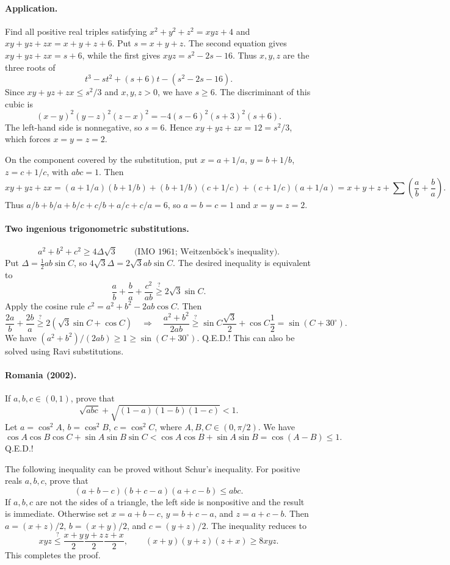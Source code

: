 \documentclass[11pt,a4paper]{article}
\begin{document}
\paragraph{Application.}
Find all positive real triples satisfying
$x^2+y^2+z^2=xyz+4$ and $xy+yz+zx=x+y+z+6$.
Put $s=x+y+z$. The second equation gives $xy+yz+zx=s+6$, while the
first gives $xyz=s^2-2s-16$. Thus $x,y,z$ are the three roots of
\[
t^3-st^2+(s+6)t-(s^2-2s-16).
\]
Since $xy+yz+zx\leq s^2/3$ and $x,y,z>0$, we have $s\geq6$.
The discriminant of this cubic is
\[
(x-y)^2(y-z)^2(z-x)^2=-4(s-6)^2(s+3)^2(s+6).
\]
The left-hand side is nonnegative, so $s=6$. Hence
$xy+yz+zx=12=s^2/3$, which forces $x=y=z=2$.

On the component covered by the substitution, put
$x=a+1/a$, $y=b+1/b$, $z=c+1/c$, with $abc=1$. Then
\[
xy+yz+zx=(a+1/a)(b+1/b)+(b+1/b)(c+1/c)+(c+1/c)(a+1/a)
=x+y+z+\sum\left(\frac ab+\frac ba\right).
\]
Thus $a/b+b/a+b/c+c/b+a/c+c/a=6$, so $a=b=c=1$ and $x=y=z=2$.

\paragraph{Two ingenious trigonometric substitutions.}
\[a^2+b^2+c^2\geq4\Delta\sqrt3
\qquad\text{(IMO 1961; Weitzenb\"ock's inequality).}\]
Put $\Delta=\tfrac12 ab\sin C$, so $4\sqrt3\Delta=2\sqrt3ab\sin C$.
The desired inequality is equivalent to
\[\frac ab+\frac ba+\frac{c^2}{ab}\mathrel{\stackrel{?}{\geq}}2\sqrt3\sin C.\]
Apply the cosine rule $c^2=a^2+b^2-2ab\cos C$. Then
\[
\frac{2a}{b}+\frac{2b}{a}\mathrel{\stackrel{?}{\geq}}2(\sqrt3\sin C+\cos C)
\quad\Longrightarrow\quad
\frac{a^2+b^2}{2ab}\mathrel{\stackrel{?}{\geq}}
\sin C\frac{\sqrt3}{2}+\cos C\frac12=\sin(C+30^\circ).
\]
We have $(a^2+b^2)/(2ab)\geq1\geq\sin(C+30^\circ)$. Q.E.D.!
This can also be solved using Ravi substitutions.
\paragraph{Romania (2002).}
If $a,b,c\in(0,1)$, prove that
\[\sqrt{abc}+\sqrt{(1-a)(1-b)(1-c)}<1.\]
Let $a=\cos^2 A$, $b=\cos^2 B$, $c=\cos^2 C$, where
$A,B,C\in(0,\pi/2)$. We have
\[\cos A\cos B\cos C+\sin A\sin B\sin C
<\cos A\cos B+\sin A\sin B=\cos(A-B)\leq1.\]
Q.E.D.!

The following inequality can be proved without Schur's inequality.
For positive reals $a,b,c$, prove that
\[(a+b-c)(b+c-a)(a+c-b)\leq abc.\]
If $a,b,c$ are not the sides of a triangle, the left side is nonpositive and
the result is immediate. Otherwise set $x=a+b-c$, $y=b+c-a$, and $z=a+c-b$.
Then $a=(x+z)/2$, $b=(x+y)/2$, and $c=(y+z)/2$.
The inequality reduces to
\[xyz\mathrel{\stackrel{?}{\leq}}\frac{x+y}{2}\frac{y+z}{2}\frac{z+x}{2},
\qquad (x+y)(y+z)(z+x)\geq8xyz.\]
This completes the proof.
\end{document}

